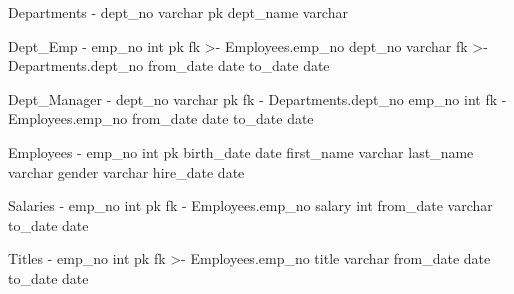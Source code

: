 Departments
-
dept_no varchar pk
dept_name varchar

Dept_Emp
-
emp_no int pk fk >- Employees.emp_no
dept_no varchar fk >- Departments.dept_no
from_date date
to_date date

Dept_Manager
-
dept_no varchar pk fk - Departments.dept_no
emp_no int fk - Employees.emp_no
from_date date
to_date date

Employees
-
emp_no int pk
birth_date date
first_name varchar
last_name varchar
gender varchar
hire_date date

Salaries
-
emp_no int pk fk - Employees.emp_no
salary int
from_date varchar
to_date date

Titles
-
emp_no int pk fk >- Employees.emp_no
title varchar
from_date date
to_date date
